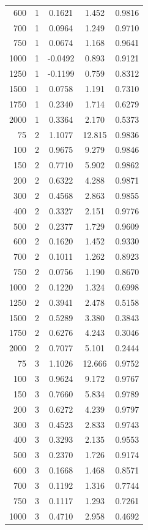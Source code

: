 \begin{longtable}{rrccc}
600 & 1 & 0.1621 & 1.452 & 0.9816 \\
700 & 1 & 0.0964 & 1.249 & 0.9710 \\
750 & 1 & 0.0674 & 1.168 & 0.9641 \\
1000 & 1 & -0.0492 & 0.893 & 0.9121 \\
1250 & 1 & -0.1199 & 0.759 & 0.8312 \\
1500 & 1 & 0.0758 & 1.191 & 0.7310 \\
1750 & 1 & 0.2340 & 1.714 & 0.6279 \\
2000 & 1 & 0.3364 & 2.170 & 0.5373 \\
75 & 2 & 1.1077 & 12.815 & 0.9836 \\
100 & 2 & 0.9675 & 9.279 & 0.9846 \\
150 & 2 & 0.7710 & 5.902 & 0.9862 \\
200 & 2 & 0.6322 & 4.288 & 0.9871 \\
300 & 2 & 0.4568 & 2.863 & 0.9855 \\
400 & 2 & 0.3327 & 2.151 & 0.9776 \\
500 & 2 & 0.2377 & 1.729 & 0.9609 \\
600 & 2 & 0.1620 & 1.452 & 0.9330 \\
700 & 2 & 0.1011 & 1.262 & 0.8923 \\
750 & 2 & 0.0756 & 1.190 & 0.8670 \\
1000 & 2 & 0.1220 & 1.324 & 0.6998 \\
1250 & 2 & 0.3941 & 2.478 & 0.5158 \\
1500 & 2 & 0.5289 & 3.380 & 0.3843 \\
1750 & 2 & 0.6276 & 4.243 & 0.3046 \\
2000 & 2 & 0.7077 & 5.101 & 0.2444 \\
75 & 3 & 1.1026 & 12.666 & 0.9752 \\
100 & 3 & 0.9624 & 9.172 & 0.9767 \\
150 & 3 & 0.7660 & 5.834 & 0.9789 \\
200 & 3 & 0.6272 & 4.239 & 0.9797 \\
300 & 3 & 0.4523 & 2.833 & 0.9743 \\
400 & 3 & 0.3293 & 2.135 & 0.9553 \\
500 & 3 & 0.2370 & 1.726 & 0.9174 \\
600 & 3 & 0.1668 & 1.468 & 0.8571 \\
700 & 3 & 0.1192 & 1.316 & 0.7744 \\
750 & 3 & 0.1117 & 1.293 & 0.7261 \\
1000 & 3 & 0.4710 & 2.958 & 0.4692 \\

\end{longtable}
